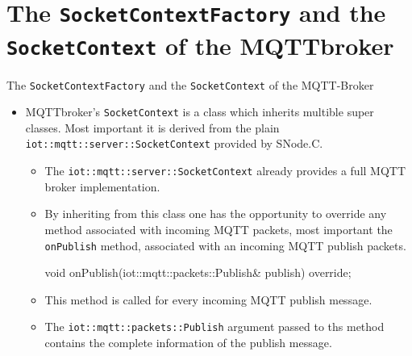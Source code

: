 \section[nosectionpage]{The \texttt{SocketContextFactory} and the \texttt{SocketContext} of the MQTTbroker}

\begin{frame}[fragile]{The \texttt{SocketContextFactory} and the \texttt{SocketContext} of the MQTT-Broker}
  \begin{itemize}
    \item \alert{MQTTbroker}'s \alert{\texttt{SocketContext}} is a class which \alert{inherits multible super classes}. Most \alert{important} it is \alert{derived from} the plain \alert{\texttt{iot::mqtt::server::SocketContext}} provided by SNode.C.
    \begin{itemize}
      \item The \alert{\texttt{iot::mqtt::server::SocketContext} already provides a full MQTT broker} implementation.
      \item By \alert{inheriting from this class} one has the \alert{opportunity} to \alert{override any method associated with incoming MQTT packets}, most \alert{important} the \alert{\texttt{onPublish}} method, \alert{associated} with an incoming \alert{MQTT publish packets}.

      \begin{cppcode}[gobble=8]
        void onPublish(iot::mqtt::packets::Publish& publish) override;
      \end{cppcode}
      \item This \alert{method is called for every incoming MQTT publish message}.
      \item The \alert{\texttt{iot::mqtt::packets::Publish}} argument passed to ths method \alert{contains the complete information of the publish message}.
    \end{itemize}
  \end{itemize}
\end{frame}
